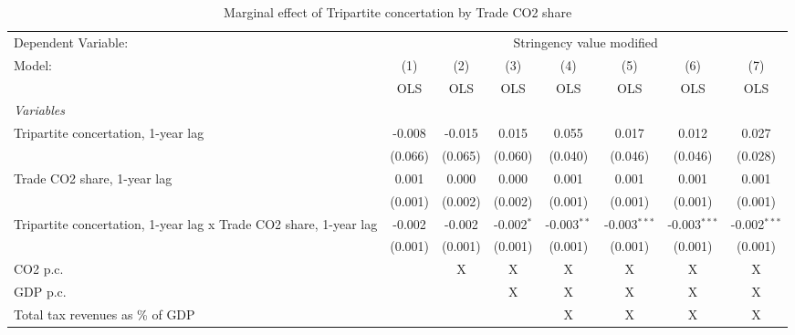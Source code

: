 
\begin{table}[htbp]
   \caption{Marginal effect of Tripartite concertation by Trade CO2 share}
   \centering
   \begin{tabular}{lccccccc}
      \toprule
      Dependent Variable: & \multicolumn{7}{c}{Stringency value modified}\\
      Model:                                                            & (1)     & (2)     & (3)          & (4)           & (5)            & (6)            & (7)\\  
                                                                        &  OLS    & OLS     & OLS          & OLS           & OLS            & OLS            & OLS\\  
      \midrule
      \emph{Variables}\\
      Tripartite concertation, 1-year lag                               & -0.008  & -0.015  & 0.015        & 0.055         & 0.017          & 0.012          & 0.027\\   
                                                                        & (0.066) & (0.065) & (0.060)      & (0.040)       & (0.046)        & (0.046)        & (0.028)\\   
      Trade CO2 share, 1-year lag                                       & 0.001   & 0.000   & 0.000        & 0.001         & 0.001          & 0.001          & 0.001\\   
                                                                        & (0.001) & (0.002) & (0.002)      & (0.001)       & (0.001)        & (0.001)        & (0.001)\\   
      Tripartite concertation, 1-year lag x Trade CO2 share, 1-year lag & -0.002  & -0.002  & -0.002$^{*}$ & -0.003$^{**}$ & -0.003$^{***}$ & -0.003$^{***}$ & -0.002$^{***}$\\   
                                                                        & (0.001) & (0.001) & (0.001)      & (0.001)       & (0.001)        & (0.001)        & (0.001)\\   
      CO2 p.c.                                                          &         & X       & X            & X             & X              & X              & X\\  
      GDP p.c.                                                          &         &         & X            & X             & X              & X              & X\\  
      Total tax revenues as \% of GDP                                   &         &         &              & X             & X              & X              & X\\  

\end{tabular}
\end{table}
